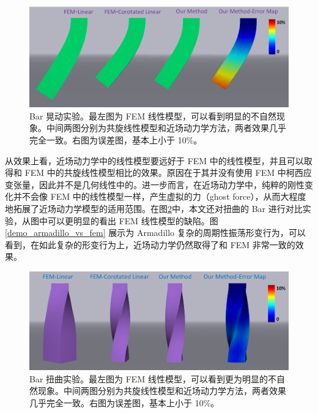 \begin{figure}[!htb]
  \centering
  \captionsetup{justification=centering}
  \includegraphics[width=0.9\linewidth]{chap/image/demo_bar_oscillate_vs_fem}

  \caption{\label{demo_bar_oscillate_vs_fem}
           Bar 晃动实验。最左图为 FEM 线性模型，可以看到明显的不自然现象。中间两图分别为共旋线性模型和近场动力学方法，两者效果几乎完全一致。右图为误差图，基本上小于 10\%。
          }
\end{figure}

从效果上看，近场动力学中的线性模型要远好于 FEM 中的线性模型，并且可以取得和 FEM 中的共旋线性模型相比的效果。原因在于其并没有使用 FEM 中柯西应变张量，因此并不是几何线性中的。进一步而言，在近场动力学中，纯粹的刚性变化并不会像 FEM 中的线性模型一样，产生虚拟的力（ghost force），从而大程度地拓展了近场动力学模型的适用范围。在图\ref{demo_bar_twist_vs_fem}中，本文还对扭曲的 Bar 进行对比实验，从图中可以更明显的看出 FEM 线性模型的缺陷。图\ref{demo_armadillo_vs_fem} 展示为 Armadillo 复杂的周期性振荡形变行为，可以看到，在如此复杂的形变行为上，近场动力学仍然取得了和 FEM 非常一致的效果。

\begin{figure}[!htb]
  \centering
  \captionsetup{justification=centering}
  \includegraphics[width=0.9\linewidth]{chap/image/demo_bar_twist_vs_fem}

  \caption{\label{demo_bar_twist_vs_fem}
           Bar 扭曲实验。最左图为 FEM 线性模型，可以看到更为明显的不自然现象。中间两图分别为共旋线性模型和近场动力学方法，两者效果几乎完全一致。右图为误差图，基本上小于 10\%。
          }
\end{figure}


